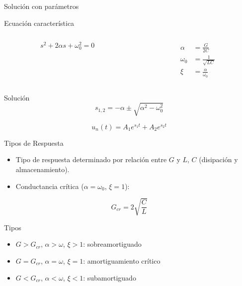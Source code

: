 \documentclass[xcolor={usenames,svgnames,dvipsnames}]{beamer}
\begin{document}
\begin{frame}[label={sec:org9914205}]{Solución con parámetros}
\begin{block}{Ecuación característica}
\begin{columns}
\begin{column}{.5\columnwidth}
\[
s^2 + 2\alpha s + \omega_0^2 = 0  
\]
\end{column}
\begin{column}{.5\columnwidth}
\begin{align*}
  \alpha &= \frac{G}{2C}\\
  \omega_0 &= \frac{1}{\sqrt{LC}}\\
  \xi &= \frac{\alpha}{\omega_0}
\end{align*}
\end{column}
\end{columns}
\end{block}

\begin{block}{Solución}
\[
  s_{1,2} = -\alpha \pm \sqrt{\alpha^2 - \omega_0^2}
\]

\[
  u_n(t) = A_1 e^{s_1 t} + A_2 e^{s_2 t}
\]
\end{block}
\end{frame}



\begin{frame}[label={sec:org23510ea}]{Tipos de Respuesta}
\begin{itemize}
\item Tipo de respuesta determinado por relación entre \(G\) y \(L\), \(C\) (disipación y almacenamiento).
\item Conductancia crítica (\(\alpha = \omega_0\), \(\xi = 1\)):
\end{itemize}

\[
  G_{cr} = 2\sqrt{\frac{C}{L}}
\]

\begin{block}{Tipos}
\begin{itemize}
\item \(G > G_{cr}\), \(\alpha > \omega\), \(\xi > 1\): \alert{sobreamortiguado}
\item \(G = G_{cr}\),  \(\alpha = \omega\), \(\xi = 1\): \alert{amortiguamiento crítico}
\item \(G < G_{cr}\),  \(\alpha < \omega\), \(\xi < 1\): \alert{subamortiguado}
\end{itemize}
\end{block}
\end{frame}
\end{document}
